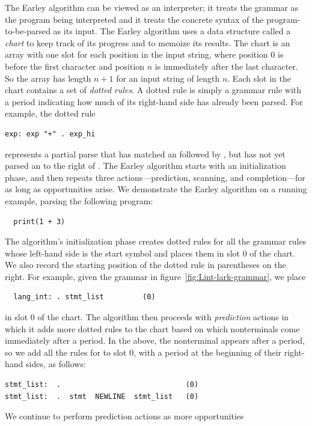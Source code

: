 \documentclass[7x10]{TimesAPriori_MIT}%
\numberwithin{theorem}{chapter}
\numberwithin{definition}{chapter}
\numberwithin{equation}{chapter}
\begin{document}
{The Earley algorithm can be viewed as an interpreter; it treats the
grammar as the program being interpreted and it treats the concrete
syntax of the program-to-be-parsed as its input.  The Earley algorithm
uses a data structure called a \emph{chart} to
keep track of its progress and to memoize its results. The chart is an
array with one slot for each position in the input string, where
position $0$ is before the first character and position $n$ is
immediately after the last character. So the array has length $n+1$
for an input string of length $n$. Each slot in the chart contains a
set of \emph{dotted rules}. A dotted rule is simply a grammar rule
with a period indicating how much of its right-hand side has already
been parsed. For example, the dotted rule
\begin{lstlisting}
exp: exp "+" . exp_hi
\end{lstlisting}
represents a partial parse that has matched an  followed by
\code{+}, but has not yet parsed an  to the right of
\code{+}.
%
The Earley algorithm starts with an initialization phase, and then
repeats three actions---prediction, scanning, and completion---for as
long as opportunities arise. We demonstrate the Earley algorithm on a
running example, parsing the following program:
\begin{lstlisting}
  print(1 + 3)
\end{lstlisting}
The algorithm's initialization phase creates dotted rules for all the
grammar rules whose left-hand side is the start symbol and places them
in slot $0$ of the chart. We also record the starting position of the
dotted rule in parentheses on the right. For example, given the
grammar in figure~\ref{fig:Lint-lark-grammar}, we place
\begin{lstlisting}
  lang_int: . stmt_list         (0)
\end{lstlisting}
in slot $0$ of the chart. The algorithm then proceeds with
\emph{prediction} actions in which it adds more dotted rules to the
chart based on which nonterminals come immediately after a period. In
the above, the nonterminal  appears after a period,
so we add all the rules for  to slot $0$, with a
period at the beginning of their right-hand sides, as follows:
\begin{lstlisting}
stmt_list:  .                             (0)
stmt_list:  .  stmt  NEWLINE  stmt_list   (0)
\end{lstlisting}
We continue to perform prediction actions as more opportunities
}
\end{document}

